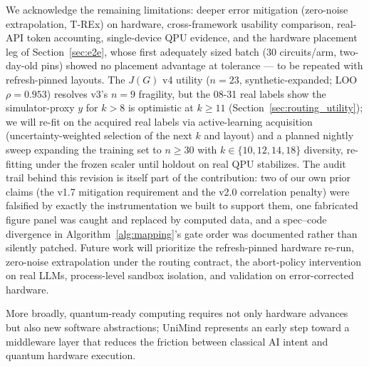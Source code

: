 ﻿\documentclass[12pt,a4paper]{article}
\begin{document}
We acknowledge the remaining limitations: deeper error mitigation (zero-noise extrapolation, T-REx) on hardware, cross-framework usability comparison, real-API token accounting, single-device QPU evidence, and the hardware placement leg of Section~\ref{sec:e2e}, whose first adequately sized batch (30 circuits/arm, two-day-old pins) showed no placement advantage at tolerance --- to be repeated with refresh-pinned layouts. The $J(G)$ v4 utility ($n{=}23$, synthetic-expanded; LOO $\rho{=}0.953$) resolves v3's $n{=}9$ fragility, but the 08-31 real labels show the simulator-proxy $y$ for $k{>}8$ is optimistic at $k\ge 11$ (Section~\ref{sec:routing_utility}); we will re-fit on the acquired real labels via active-learning acquisition (uncertainty-weighted selection of the next $k$ and layout) and a planned nightly sweep expanding the training set to $n{\ge}30$ with $k{\in}\{10,12,14,18\}$ diversity, re-fitting under the frozen scaler until holdout on real QPU stabilizes. The audit trail behind this revision is itself part of the contribution: two of our own prior claims (the v1.7 mitigation requirement and the v2.0 correlation penalty) were falsified by exactly the instrumentation we built to support them, one fabricated figure panel was caught and replaced by computed data, and a spec--code divergence in Algorithm~\ref{alg:mapping}'s gate order was documented rather than silently patched. Future work will prioritize the refresh-pinned hardware re-run, zero-noise extrapolation under the routing contract, the abort-policy intervention on real LLMs, process-level sandbox isolation, and validation on error-corrected hardware.

More broadly, quantum-ready computing requires not only hardware advances but also new software abstractions; UniMind represents an early step toward a middleware layer that reduces the friction between classical AI intent and quantum hardware execution.
\end{document}
